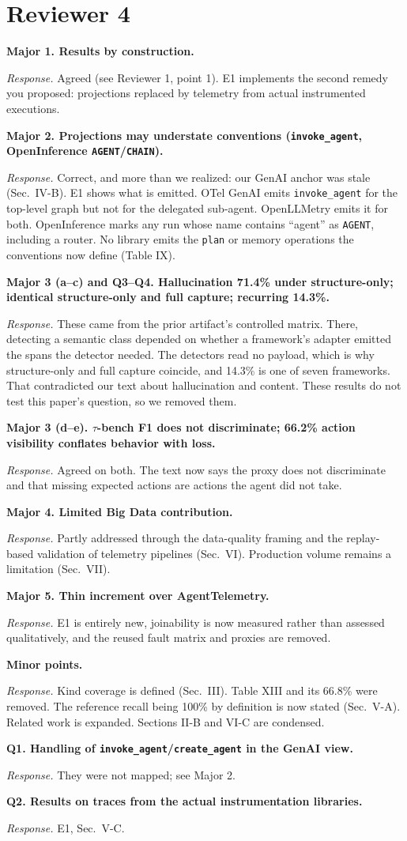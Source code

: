 \documentclass[10pt]{article}
\newcommand{\rc}[1]{\par\medskip\textbf{#1}\par}
\newcommand{\resp}{\par\emph{Response.} }
\begin{document}
\section*{Reviewer 4}
\rc{Major 1. Results by construction.}
\resp Agreed (see Reviewer 1, point 1). E1 implements the second remedy you
proposed: projections replaced by telemetry from actual instrumented
executions.

\rc{Major 2. Projections may understate conventions (\texttt{invoke\_agent},
OpenInference \texttt{AGENT}/\texttt{CHAIN}).}
\resp Correct, and more than we realized: our GenAI anchor was stale
(Sec.~IV-B). E1 shows what is emitted. OTel GenAI emits
\texttt{invoke\_agent} for the top-level graph but not for the delegated
sub-agent. OpenLLMetry emits it for both. OpenInference marks any run
whose name contains ``agent'' as \texttt{AGENT}, including a router. No library emits the
\texttt{plan} or memory operations the conventions now define
(Table IX).

\rc{Major 3 (a--c) and Q3--Q4. Hallucination 71.4\% under structure-only;
identical structure-only and full capture; recurring 14.3\%.}
\resp These came from the prior artifact's controlled matrix. There,
detecting a semantic class depended on whether a framework's adapter
emitted the spans the detector needed. The detectors read no payload,
which is why structure-only and full capture coincide, and 14.3\% is one
of seven frameworks. That contradicted our text about hallucination and
content. These results do not test this paper's question, so we removed
them.

\rc{Major 3 (d--e). $\tau$-bench F1 does not discriminate; 66.2\% action
visibility conflates behavior with loss.}
\resp Agreed on both. The text now says the proxy does not discriminate
and that missing expected actions are actions the agent did not take.

\rc{Major 4. Limited Big Data contribution.}
\resp Partly addressed through the data-quality framing and the
replay-based validation of telemetry pipelines (Sec.~VI). Production
volume remains a limitation (Sec.~VII).

\rc{Major 5. Thin increment over AgentTelemetry.}
\resp E1 is entirely new, joinability is now measured rather than assessed
qualitatively, and the reused fault matrix and proxies are removed.

\rc{Minor points.}
\resp Kind coverage is defined (Sec.~III). Table XIII and its 66.8\% were
removed. The reference recall being 100\% by definition is now stated
(Sec.~V-A). Related work is expanded. Sections II-B and VI-C are
condensed.

\rc{Q1. Handling of \texttt{invoke\_agent}/\texttt{create\_agent} in the
GenAI view.} \resp They were not mapped; see Major 2.
\rc{Q2. Results on traces from the actual instrumentation libraries.}
\resp E1, Sec.~V-C.
\end{document}
